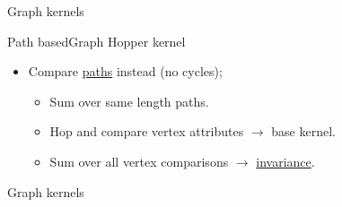 \documentclass[12pt]{beamer}
\begin{document}
            \begin{frame}{Graph kernels}
                \centering
            \end{frame}

            \begin{frame}{Path based}{Graph Hopper kernel}
                \begin{figure}[H]
                    \centering
                    
                \end{figure}

                \begin{itemize}[label=\(\blacktriangleright\), font=\color{IGNGreen}]
                    \item<2-> Compare \underline{paths} instead (no cycles);
                    \begin{itemize}[label=\(\blacktriangleright\), font=\color{IGNGreen}]
                        \item<3-> Sum over same length paths.
                        \item<7-> Hop and compare vertex attributes \(\longrightarrow\) base kernel.
                        \item<11-> Sum over all vertex comparisons \(\longrightarrow\) \underline{invariance}.
                    \end{itemize}
                \end{itemize}
            \end{frame}

            \begin{frame}{Graph kernels}
                \centering
                
            \end{frame}
\end{document}
